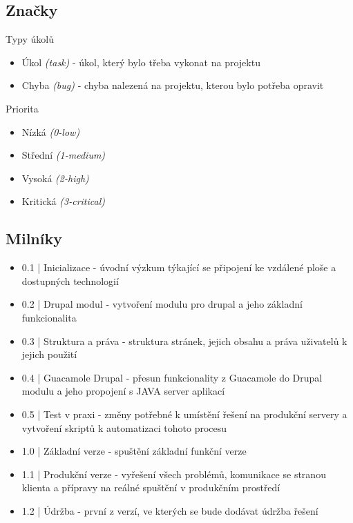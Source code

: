 \subsection{Značky}
Typy úkolů
\begin{itemize}
  \item Úkol \emph{(task)} - úkol, který bylo třeba vykonat na projektu
  \item Chyba \emph{(bug)} - chyba nalezená na projektu, kterou bylo potřeba opravit
\end{itemize}
Priorita
\begin{itemize}
	\item Nízká \emph{(0-low)}
	\item Střední \emph{(1-medium)}
	\item Vysoká  \emph{(2-high)}
	\item Kritická \emph{(3-critical)}
\end{itemize}

\subsection{Milníky}
\begin{itemize}
  \item 0.1 | Inicializace - úvodní výzkum týkající se připojení ke vzdálené ploše a dostupných technologií
  \item 0.2 | Drupal modul - vytvoření modulu pro drupal a jeho základní funkcionalita
  \item 0.3 | Struktura a práva - struktura stránek, jejich obsahu a práva uživatelů k jejich použití
  \item 0.4 | Guacamole Drupal - přesun funkcionality z Guacamole do Drupal modulu a jeho propojení s JAVA server aplikací
  \item 0.5 | Test v praxi - změny potřebné k umístění řešení na produkční servery a vytvoření skriptů k automatizaci tohoto procesu
  \item 1.0 | Základní verze - spuštění základní funkční verze
  \item 1.1 | Produkční verze - vyřešení všech problémů, komunikace se stranou klienta a přípravy na reálné spuštění v produkčním prostředí
  \item 1.2 | Údržba - první z verzí, ve kterých se bude dodávat údržba řešení
\end{itemize}
